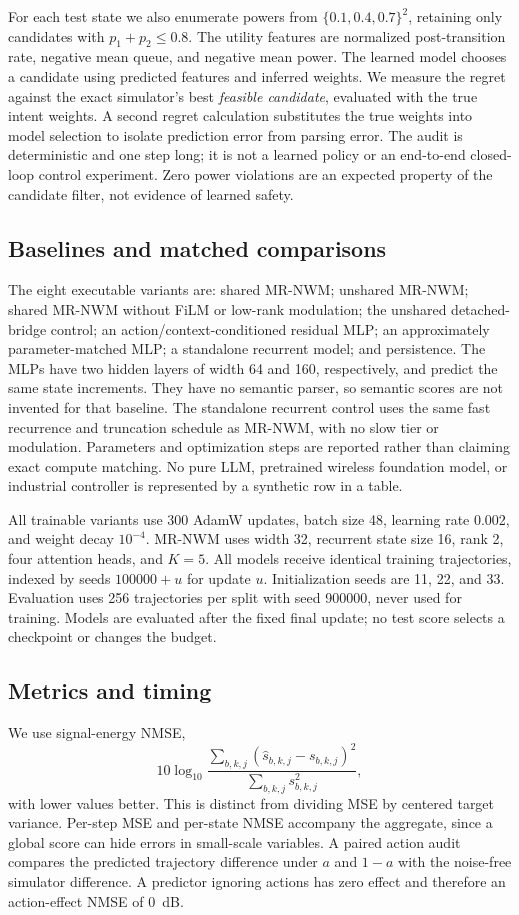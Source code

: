 \documentclass[10pt,twocolumn]{article}
\begin{document}
For each test state we also enumerate powers from
$\{0.1,0.4,0.7\}^2$, retaining only candidates with
$p_1+p_2\leq0.8$. The utility features are normalized post-transition rate,
negative mean queue, and negative mean power. The learned model chooses a
candidate using predicted features and inferred weights. We measure the regret
against the exact simulator's best \emph{feasible candidate}, evaluated with
the true intent weights. A second regret calculation substitutes the true
weights into model selection to isolate prediction error from parsing error.
The audit is deterministic and one step long; it is not a learned policy or
an end-to-end closed-loop control experiment. Zero power violations are an
expected property of the candidate filter, not evidence of learned safety.

\subsection{Baselines and matched comparisons}
The eight executable variants are: shared MR-NWM; unshared MR-NWM; shared MR-NWM
without FiLM or low-rank modulation; the unshared detached-bridge control; an
action/context-conditioned residual MLP; an approximately parameter-matched MLP;
a standalone recurrent model; and persistence. The MLPs have two hidden layers
of width 64 and 160, respectively, and predict the same state increments. They have no
semantic parser, so semantic scores are not invented for that baseline.
The standalone recurrent control uses the same fast recurrence and truncation
schedule as MR-NWM, with no slow tier or modulation. Parameters and optimization
steps are reported rather than claiming exact compute matching. No pure LLM,
pretrained wireless foundation model, or
industrial controller is represented by a synthetic row in a table.

All trainable variants use 300 AdamW updates, batch size 48, learning rate 0.002,
and weight decay $10^{-4}$. MR-NWM uses width 32, recurrent state size 16, rank 2,
four attention heads, and $K=5$. All models receive identical training
trajectories, indexed by seeds $100000+u$ for update $u$. Initialization seeds
are 11, 22, and 33. Evaluation uses 256 trajectories per split with seed
900000, never used for training. Models are evaluated after the fixed final
update; no test score selects a checkpoint or changes the budget.

\subsection{Metrics and timing}
We use signal-energy NMSE,
\begin{equation}
 10\log_{10}\frac{\sum_{b,k,j}(\hat s_{b,k,j}-s_{b,k,j})^2}
                      {\sum_{b,k,j}s_{b,k,j}^2},
\end{equation}
with lower values better. This is distinct from dividing MSE by centered
target variance. Per-step MSE and per-state NMSE accompany the aggregate,
since a global score can hide errors in small-scale variables. A paired action
audit compares the predicted trajectory difference under $a$ and $1-a$ with
the noise-free simulator difference. A predictor ignoring actions has zero
effect and therefore an action-effect NMSE of 0~dB.
\end{document}
